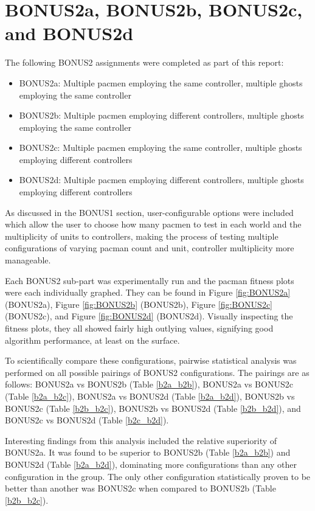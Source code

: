 \documentclass[11pt]{article}
\begin{document}
\section{BONUS2a, BONUS2b, BONUS2c, and BONUS2d}
The following BONUS2 assignments were completed as part of this report:

\begin{itemize}
    \item BONUS2a: Multiple pacmen employing the same controller, multiple ghosts employing the same controller
    \item BONUS2b: Multiple pacmen employing different controllers, multiple ghosts employing the same controller
    \item BONUS2c: Multiple pacmen employing the same controller, multiple ghosts employing different controllers
    \item BONUS2d: Multiple pacmen employing different controllers, multiple ghosts employing different controllers
\end{itemize}

As discussed in the BONUS1 section, user-configurable options were included which allow the user to choose
how many pacmen to test in each world and the multiplicity of units to controllers, making the process
of testing multiple configurations of varying pacman count and unit, controller multiplicity more manageable.

Each BONUS2 sub-part was experimentally run and the pacman fitness plots were each individually graphed. They
can be found in Figure \ref{fig:BONUS2a} (BONUS2a), Figure \ref{fig:BONUS2b} (BONUS2b), Figure \ref{fig:BONUS2c}
(BONUS2c), and Figure \ref{fig:BONUS2d} (BONUS2d). Visually inspecting the fitness plots, they all showed 
fairly high outlying values, signifying good algorithm performance, at least on the surface.

To scientifically compare these configurations, pairwise statistical analysis was performed on all possible pairings
of BONUS2 configurations. The pairings are as follows: BONUS2a vs BONUS2b (Table \ref{b2a_b2b}), 
BONUS2a vs BONUS2c (Table \ref{b2a_b2c}), BONUS2a vs BONUS2d (Table \ref{b2a_b2d}), 
BONUS2b vs BONUS2c (Table \ref{b2b_b2c}), BONUS2b vs BONUS2d (Table \ref{b2b_b2d}), and BONUS2c vs BONUS2d (Table \ref{b2c_b2d}).

Interesting findings from this analysis included the relative superiority of BONUS2a.
It was found to be superior to BONUS2b (Table \ref{b2a_b2b}) and BONUS2d 
(Table \ref{b2a_b2d}), dominating more configurations than any other configuration in the group.
The only other configuration statistically proven to be better than another was BONUS2c
when compared to BONUS2b (Table \ref{b2b_b2c}).
\end{document}
